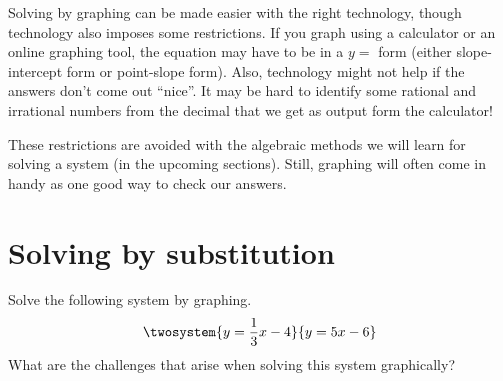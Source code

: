 Solving by graphing can be made easier with the right technology, though technology also imposes some restrictions. If you graph using a calculator or an online graphing tool, the equation may have to be in a $y=$ form (either slope-intercept form or point-slope form). Also, technology might not help if the answers don't come out ``nice''. It may be hard to identify some rational and irrational numbers from the decimal that we get as output form the calculator!

These restrictions are avoided with the algebraic methods we will learn for solving a system (in the upcoming sections). Still, graphing will often come in handy as one good way to check our answers.



\section{Solving by substitution}
\label{sec:syssubstitution}

\begin{boxexplore}
Solve the following system by graphing.
\[\twosystem{y=\frac{1}{3}x-4}{y=5x-6}\]
What are the challenges that arise when solving this system graphically?
\end{boxexplore}

